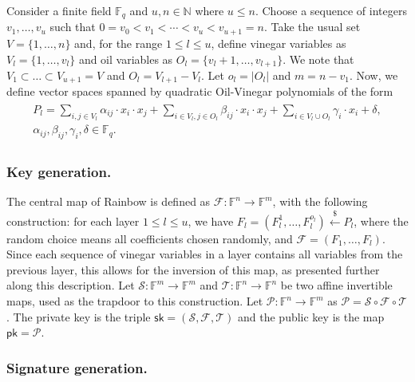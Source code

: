 \documentclass[draft, 12pt, a4paper, oneside]{memoir}
\newcommand{\random}{\stackrel{\$}{\longleftarrow}}
\theoremstyle{definition}
\begin{document}
Consider a finite field $\mathbb{F}_{q}$ and
$u, n \in \mathbb{N}$ where $u \leq n$. Choose a sequence of integers
$v_{1}, \dots, v_{u}$ such that
$0 = v_{0} < v_{1} < \cdots < v_{u} < v_{u + 1} = n$. Take the usual set
$V = \{1, \dots, n\}$ and, for the range $1 \leq l \leq u$, define vinegar variables as
$V_{l} = \{1, \dots, v_{l}\}$ and oil variables as $O_{l} = \{v_{l} + 1, \dots, v_{l + 1}\}$. We note that $V_{1} \subset \dots \subset V_{u + 1} = V$ and $O_{l} = V_{l + 1} - V_{l}$. Let $o_{l} = |O_{l}|$ and $m = n - v_{1}$. Now,
we define vector spaces spanned by quadratic Oil-Vinegar polynomials of the
form
\begin{align}\label{eq:ov}
  \begin{split}
    P_{l} = \sum_{i, j \in V_{l}} \alpha_{ij} \cdot x_{i} \cdot x_{j}
      + \sum_{i \in V_{l}, j \in O_{l}} \beta_{ij} \cdot x_{i} \cdot x_{j}
      + \sum_{i \in V_{l} \cup O_{l}} \gamma_{i} \cdot x_{i} + \delta, \\
      \alpha_{ij}, \beta_{ij}, \gamma_{i}, \delta \in \mathbb{F}_{q}.
  \end{split}
\end{align}

\subsubsection{Key generation.}

The central map of Rainbow is defined as
$\mathcal{F} : \mathbb{F}^{n} \to \mathbb{F}^{m}$, with the
following construction: for each layer $1 \leq l \leq u$, we have
$F_{l} = (F_{l}^{1}, \dots, F_{l}^{o_{l}}) \random P_{l}$, where the random choice means all
coefficients chosen randomly,
and $\mathcal{F} = (F_{1}, \dots, F_{l})$. Since each sequence of vinegar
variables in a layer contains all variables from the previous layer, this
allows for the inversion of this map, as presented further along this description. Let
$\mathcal{S} : \mathbb{F}^{m} \to \mathbb{F}^{m}$ and
$\mathcal{T} : \mathbb{F}^{n} \to \mathbb{F}^{n}$ be two affine
invertible maps, used as the trapdoor to this construction. Let
$\mathcal{P} : \mathbb{F}^{n} \to \mathbb{F}^{m}$ as
$\mathcal{P} = \mathcal{S} \circ \mathcal{F} \circ \mathcal{T}$.
The private key is the triple
$\mathsf{sk} = (\mathcal{S}, \mathcal{F}, \mathcal{T})$ and the public key is the map
$\mathsf{pk} = \mathcal{P}$.

\subsubsection{Signature generation.}
\end{document}
